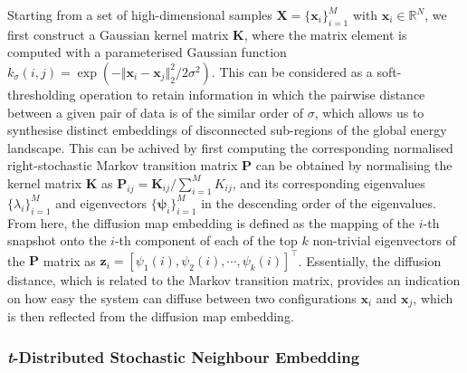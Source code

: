 Starting from a set of high-dimensional samples $\bm{X}=\{\bm{x}_i\}_{i=1}^M$ with $\bm{x}_i \in \mathbb{R}^N$, we first construct a Gaussian kernel matrix $\bm{K}$, where the matrix element is computed with a parameterised Gaussian function $k_\sigma(i,j)=\exp(-\Vert \bm{x}_i-\bm{x}_j\Vert_2^2/2\sigma^2)$. This can be considered as a soft-thresholding operation to retain information in which the pairwise distance between a given pair of data is of the similar order of $\sigma$, which allows us to synthesise distinct embeddings of disconnected sub-regions of the global energy landscape. This can be achived by first computing the corresponding normalised right-stochastic Markov transition matrix $\bm{P}$ can be obtained by normalising the kernel matrix $\bm{K}$ as $\bm{P}_{ij}=\bm{K}_{ij}/\sum_{i=1}^M K_{ij}$, and its corresponding eigenvalues $\{\lambda_i\}_{i=1}^M$ and eigenvectors $\{\bm{\psi}_i\}_{i=1}^M$ in the descending order of the eigenvalues. From here, the diffusion map embedding is defined as the mapping of the $i$-th snapshot onto the $i$-th component of each of the top $k$ non-trivial eigenvectors of the $\bm{P}$ matrix as $\bm{z}_i=[\psi_1(i),\psi_2(i),\cdots,\psi_k(i)]^\top$. Essentially, the diffusion distance, which is related to the Markov transition matrix, provides an indication on how easy the system can diffuse between two configurations $\bm{x}_i$ and $\bm{x}_j$, which is then reflected from the diffusion map embedding.


\subsubsection{\textit{t}-Distributed Stochastic Neighbour Embedding}
\label{appendix:t_sne}

